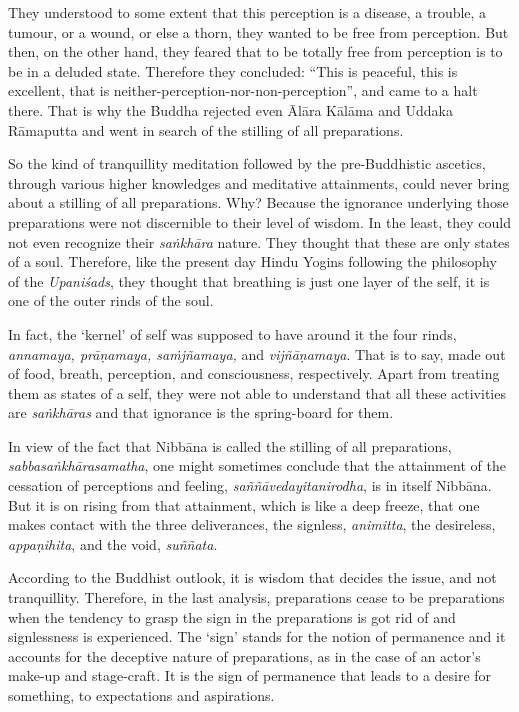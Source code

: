 They understood to some extent that this perception is a disease, a trouble, a tumour, or a wound, or else a thorn, they wanted to be free from perception. But then, on the other hand, they feared that to be totally free from perception is to be in a deluded state. Therefore they concluded: ``This is peaceful, this is excellent, that is neither-perception-nor-non-perception'', and came to a halt there. That is why the Buddha rejected even Ālāra Kālāma and Uddaka Rāmaputta and went in search of the stilling of all preparations.

So the kind of tranquillity meditation followed by the pre-Buddhistic ascetics, through various higher knowledges and meditative attainments, could never bring about a stilling of all preparations. Why? Because the ignorance underlying those preparations were not discernible to their level of wisdom. In the least, they could not even recognize their \emph{saṅkhāra} nature. They thought that these are only states of a soul. Therefore, like the present day Hindu Yogins following the philosophy of the \emph{Upaniśads}, they thought that breathing is just one layer of the self, it is one of the outer rinds of the soul.

\clearpage

In fact, the `kernel' of self was supposed to have around it the four rinds, \emph{annamaya, prāṇamaya, saṁjñamaya,} and \emph{vijñāṇamaya}. That is to say, made out of food, breath, perception, and consciousness, respectively. Apart from treating them as states of a self, they were not able to understand that all these activities are \emph{saṅkhāras} and that ignorance is the spring-board for them.

In view of the fact that Nibbāna is called the stilling of all preparations, \emph{sabbasaṅkhārasamatha}, one might sometimes conclude that the attainment of the cessation of perceptions and feeling, \emph{saññāvedayitanirodha}, is in itself Nibbāna. But it is on rising from that attainment, which is like a deep freeze, that one makes contact with the three deliverances, the signless, \emph{animitta}, the desireless, \emph{appaṇihita}, and the void, \emph{suññata}.

According to the Buddhist outlook, it is wisdom that decides the issue, and not tranquillity. Therefore, in the last analysis, preparations cease to be preparations when the tendency to grasp the sign in the preparations is got rid of and signlessness is experienced. The `sign' stands for the notion of permanence and it accounts for the deceptive nature of preparations, as in the case of an actor's make-up and stage-craft. It is the sign of permanence that leads to a desire for something, to expectations and aspirations.

